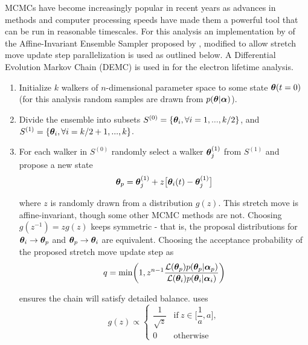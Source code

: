 MCMCs have become increasingly popular in recent years as advances in methods and computer processing speeds have made them
a powerful tool that can be run in reasonable timescales.  For this analysis an implementation by  of
the Affine-Invariant Ensemble Sampler proposed by , modified to allow stretch move update step parallelization is
used as outlined below.  A Differential Evolution Markov Chain (DEMC) is used in  for the electron
lifetime analysis.

\begin{enumerate}
\item Initialize $k$ walkers of $n$-dimensional parameter space to some state $\boldsymbol{\theta}(t = 0)$ (for this analysis random samples
are drawn from $p(\boldsymbol{\theta}|\boldsymbol{\alpha})$).

\item \label{itm:divide} Divide the ensemble into subsets $S^{(0)} = \{\boldsymbol{\theta}_i, \forall i = 1, . . ., k/2\}$, and
$S^{(1)} = \{\boldsymbol{\theta}_i, \forall i = k/2 + 1, . . ., k\}$.

\item \label{itm:newstate} For each walker in $S^{(0)}$ randomly select a walker $\boldsymbol{\theta}_j^{(1)}$ from $S^{(1)}$ and propose a new
state
\begin{equation}
\boldsymbol{\theta}_p = \boldsymbol{\theta}_j^{(1)} + z \big[ \boldsymbol{\theta}_i(t) - \boldsymbol{\theta}_j^{(1)} \big]
\label{eq:er_nr_calibrations_parameter_determ_mcmc_walker_update}
\end{equation}

\noindent where $z$ is randomly drawn from a distribution $g(z)$. This stretch move is affine-invariant, though some other MCMC
methods are not.  Choosing
$g(z^{-1}) = z g(z)$ keeps  symmetric - that is, the proposal
distributions for $\boldsymbol{\theta}_i \rightarrow \boldsymbol{\theta}_p$ and $\boldsymbol{\theta}_p \rightarrow \boldsymbol{\theta}_i$ are
equivalent.  Choosing the
acceptance probability of the proposed stretch move update step as
\begin{equation}
q = \mathrm{min} \bigg( 1, z^{n - 1} \frac{\mathcal{L}(\boldsymbol{\theta}_p)p(\boldsymbol{\theta}_p|\boldsymbol{\alpha}_p)}
{\mathcal{L}(\boldsymbol{\theta}_i)p(\boldsymbol{\theta}_i|\boldsymbol{\alpha}_i)} \bigg)
\label{eq:er_nr_calibrations_parameter_determ_mcmc_prob}
\end{equation}

\noindent ensures the chain will satisfy detailed balance.   uses
\begin{equation}
g(z) \propto
\begin{cases}
\dfrac{1}{\sqrt{z}} & \mathrm{if}\ z \in \bigg[ \dfrac{1}{a}, a \bigg], \\
0 & \mathrm{otherwise}
\end{cases}
\end{equation}


\end{enumerate}
